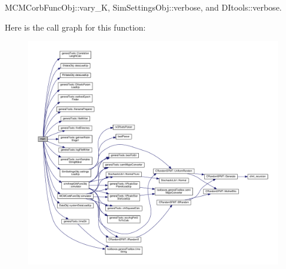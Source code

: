 M\-C\-M\-Corb\-Func\-Obj\-::vary\-\_\-\-K, Sim\-Settings\-Obj\-::verbose, and D\-Itools\-::verbose.



Here is the call graph for this function\-:
\nopagebreak
\begin{figure}[H]
\begin{center}
\leavevmode
\includegraphics[width=350pt]{_m_c_m_corb_simulator_8cpp_a0ddf1224851353fc92bfbff6f499fa97_cgraph}
\end{center}
\end{figure}


